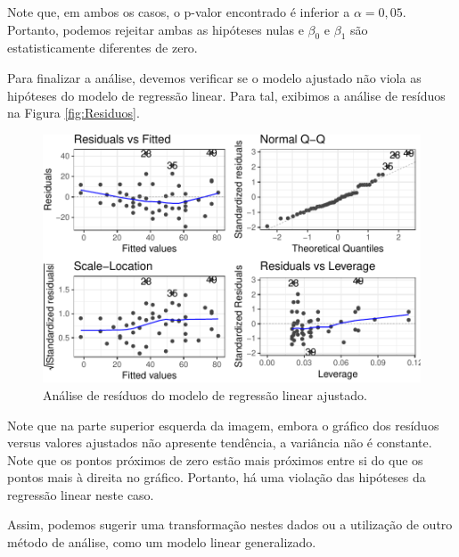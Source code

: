 \documentclass[a4paper,12pt,twoside,printwatermark=true]{modeloLEA}
\numberwithin{equation}{section}
\numberwithin{figure}{section}
\numberwithin{table}{section}
\begin{document}
Note que, em ambos os casos, o p-valor encontrado é inferior a
\(\alpha = 0,05\). Portanto, podemos rejeitar ambas as hipóteses nulas e
\(\beta_0\) e \(\beta_1\) são estatisticamente diferentes de zero.

Para finalizar a análise, devemos verificar se o modelo ajustado não
viola as hipóteses do modelo de regressão linear. Para tal, exibimos a
análise de resíduos na Figura \ref{fig:Residuos}.

\begin{Shaded}
\begin{Highlighting}[]
\end{Highlighting}
\end{Shaded}

\begin{figure}[h]

{\centering \includegraphics{skeleton_files/figure-latex/residuos-1} 

}

\caption{\label{fig:Residuos} Análise de resíduos do modelo de regressão linear ajustado.}\label{fig:residuos}
\end{figure}

Note que na parte superior esquerda da imagem, embora o gráfico dos
resíduos versus valores ajustados não apresente tendência, a variância
não é constante. Note que os pontos próximos de zero estão mais próximos
entre si do que os pontos mais à direita no gráfico. Portanto, há uma
violação das hipóteses da regressão linear neste caso.

Assim, podemos sugerir uma transformação nestes dados ou a utilização de
outro método de análise, como um modelo linear generalizado.





\end{document}
